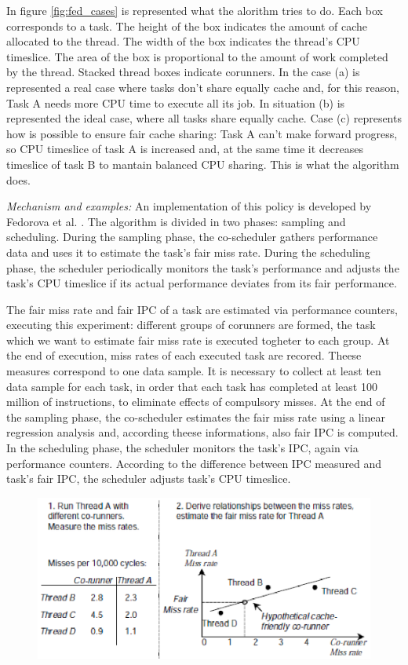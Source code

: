 \begin{description}
In figure \ref{fig:fed_cases} is represented what the alorithm tries to do. Each box corresponds to a task. The height of the box indicates the amount of
cache allocated to the thread. The width of the box indicates the thread's CPU timeslice. The area of the box is proportional to the amount of work 
completed by the thread. Stacked thread boxes indicate corunners. In the case (a) is represented a real case where tasks don't share equally cache and, for 
this reason, Task A needs more CPU time to execute all its job. In situation (b) is represented the ideal case, where all tasks share equally 
cache. Case (c) represents how is possible to ensure fair cache sharing: Task A can't make forward progress, so CPU timeslice of task A is increased 
and, at the same time it decreases timeslice of task B to mantain balanced CPU sharing. This is what the algorithm does. 

\textit{Mechanism and examples:} An implementation of this policy is developed by Fedorova et al. \cite{fedorova}. The algorithm is divided in two phases: 
sampling and scheduling. During the sampling phase, the co-scheduler gathers performance data and uses it to estimate the task's fair miss rate. During the 
scheduling phase, the scheduler periodically monitors the task's performance and adjusts the task's CPU timeslice if its actual performance deviates from 
its fair performance.

The fair miss rate and fair IPC of a task are estimated via performance counters, executing this experiment: different groups of corunners are formed, 
the task which we want to estimate fair miss rate is executed togheter to each group. At the end of execution, miss rates of each executed task are 
recored. Theese measures correspond to one data sample. It is necessary to collect at least ten data sample for each task, in order that each task has 
completed at least 100 million of instructions, to eliminate effects of compulsory misses. At the end of the sampling phase, the co-scheduler estimates the 
fair miss rate using a linear regression analysis and, according theese informations, also fair IPC is computed. In the scheduling phase, the scheduler 
monitors the task's IPC, again via performance counters. According to the difference between IPC measured and task's fair IPC, the scheduler adjusts task's 
CPU timeslice.

\begin{figure}[htbp]
\centering
\includegraphics[width=\widefigure]{images/fedorova.eps}
\caption{}
\label{fig:fedorova}
\end{figure}



\end{description}
